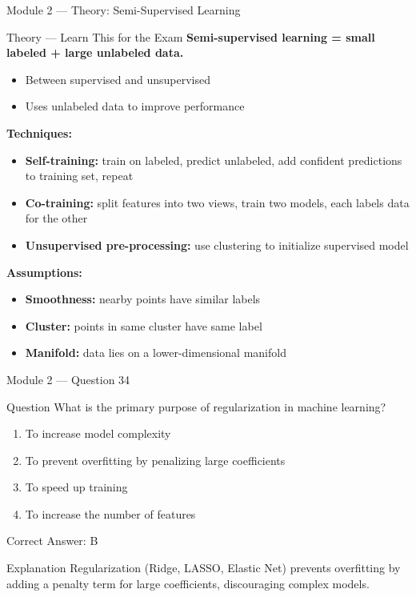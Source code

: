 \documentclass[aspectratio=169,10pt]{beamer}
\newcommand{\question}[1]{%
	\begin{block}{Question}
		#1
	\end{block}
}
\newcommand{\options}[4]{%
	\begin{enumerate}[label=\Alph*.,leftmargin=*]
		\item #1
		\item #2
		\item #3
		\item #4
	\end{enumerate}
}
\newcommand{\answerbox}[1]{%
	\begin{exampleblock}{Correct Answer: #1}
	\end{exampleblock}
}
\newcommand{\explain}[1]{%
	\begin{block}{Explanation}
		\small #1
	\end{block}
}
\newcommand{\theory}[1]{%
	\begin{block}{Theory --- Learn This for the Exam}
		\small #1
	\end{block}
}
\begin{document}
	\begin{frame}{Module 2 --- Theory: Semi-Supervised Learning}
		\theory{
			\textbf{Semi-supervised learning = small labeled + large unlabeled data.}
			\begin{itemize}
				\item Between supervised and unsupervised
				\item Uses unlabeled data to improve performance
			\end{itemize}
			\textbf{Techniques:}
			\begin{itemize}
				\item \textbf{Self-training:} train on labeled, predict unlabeled, add confident predictions to training set, repeat
				\item \textbf{Co-training:} split features into two views, train two models, each labels data for the other
				\item \textbf{Unsupervised pre-processing:} use clustering to initialize supervised model
			\end{itemize}
			\textbf{Assumptions:}
			\begin{itemize}
				\item \textbf{Smoothness:} nearby points have similar labels
				\item \textbf{Cluster:} points in same cluster have same label
				\item \textbf{Manifold:} data lies on a lower-dimensional manifold
			\end{itemize}
		}
	\end{frame}
	
	\begin{frame}{Module 2 --- Question 34}
		\question{What is the primary purpose of regularization in machine learning?}
		\options{To increase model complexity}{To prevent overfitting by penalizing large coefficients}{To speed up training}{To increase the number of features}
		\answerbox{B}
		\explain{Regularization (Ridge, LASSO, Elastic Net) prevents overfitting by adding a penalty term for large coefficients, discouraging complex models.}
	\end{frame}
	
\end{document}
